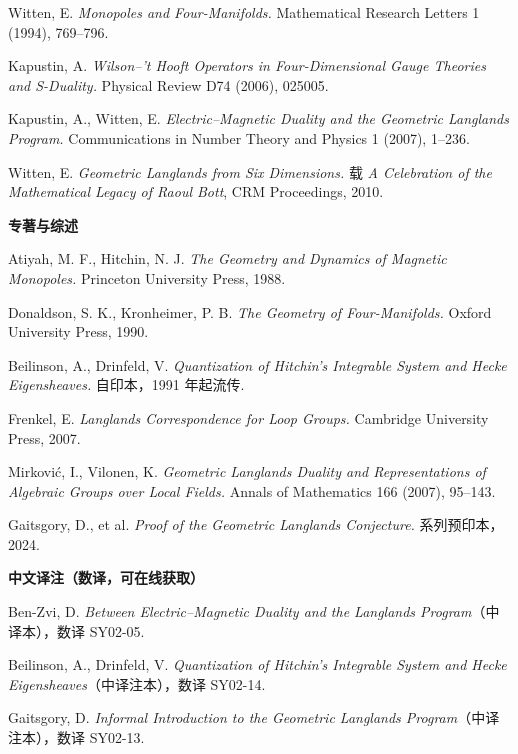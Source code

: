 Witten, E. \emph{Monopoles and Four-Manifolds.} Mathematical Research Letters 1 (1994), 769--796.

Kapustin, A. \emph{Wilson--'t Hooft Operators in Four-Dimensional Gauge Theories and S-Duality.} Physical Review D74 (2006), 025005.

Kapustin, A., Witten, E. \emph{Electric--Magnetic Duality and the Geometric Langlands Program.} Communications in Number Theory and Physics 1 (2007), 1--236.

Witten, E. \emph{Geometric Langlands from Six Dimensions.} 载 \emph{A Celebration of the Mathematical Legacy of Raoul Bott}, CRM Proceedings, 2010.

\bigskip
\noindent\textbf{专著与综述}

Atiyah, M. F., Hitchin, N. J. \emph{The Geometry and Dynamics of Magnetic Monopoles.} Princeton University Press, 1988.

Donaldson, S. K., Kronheimer, P. B. \emph{The Geometry of Four-Manifolds.} Oxford University Press, 1990.

Beilinson, A., Drinfeld, V. \emph{Quantization of Hitchin's Integrable System and Hecke Eigensheaves.} 自印本，1991 年起流传.

Frenkel, E. \emph{Langlands Correspondence for Loop Groups.} Cambridge University Press, 2007.

Mirković, I., Vilonen, K. \emph{Geometric Langlands Duality and Representations of Algebraic Groups over Local Fields.} Annals of Mathematics 166 (2007), 95--143.

Gaitsgory, D., et al. \emph{Proof of the Geometric Langlands Conjecture.} 系列预印本，2024.

\bigskip
\noindent\textbf{中文译注（数译，可在线获取）}

Ben-Zvi, D. \emph{Between Electric--Magnetic Duality and the Langlands Program}（中译本），数译 SY02-05.

Beilinson, A., Drinfeld, V. \emph{Quantization of Hitchin's Integrable System and Hecke Eigensheaves}（中译注本），数译 SY02-14.

Gaitsgory, D. \emph{Informal Introduction to the Geometric Langlands Program}（中译注本），数译 SY02-13.

\endgroup
